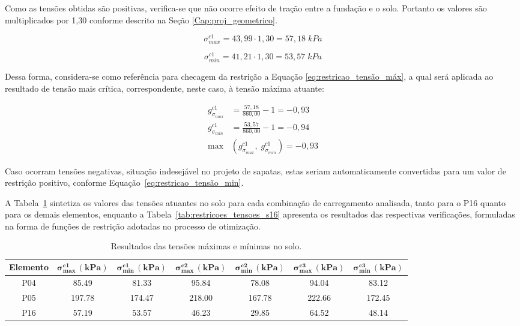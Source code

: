 Como as tensões obtidas são positivas, verifica-se que não ocorre efeito de tração entre a fundação e o solo. Portanto os valores são multiplicados por 1,30 conforme descrito na Seção \ref{Cap:proj_geometrico}.

\begin{equation}
\sigma_{max}^{c1} = 43,99 \cdot 1,30 = 57,18 \; kPa
\label{eq:EL16_sigma_max_cor}
\end{equation}

\begin{equation}
\sigma_{min}^{c1} = 41,21 \cdot 1,30 = 53,57 \; kPa
\label{eq:EL16_sigma_min_cor}
\end{equation}

Dessa forma, considera-se como referência para checagem da restrição a Equação \eqref{eq:restricao_tensão_máx}, a qual será aplicada ao resultado de tensão mais crítica, correspondente, neste caso, à tensão máxima atuante:

\begin{align}
g_{\sigma_{max}}^{c1} &= \frac{57,18}{860{,}00} - 1 = -0{,}93
    \label{eq:EL16_restricao_tensao_max} \\
g_{\sigma_{min}}^{c1} &= \frac{53,57}{860{,}00} - 1 = -0{,}94
    \label{eq:EL16_restricao_tensao_min} \\
\max &\left(g_{\sigma_{max}}^{c1},\; g_{\sigma_{min}}^{c1}\right) = -0{,}93
    \label{eq:EL16_max_tensoes}
\end{align}

Caso ocorram tensões negativas, situação indesejável no projeto de sapatas, estas seriam automaticamente convertidas para um valor de restrição positivo, conforme Equação~\eqref{eq:restricao_tensão_min}.

A Tabela~\ref{tab:tensoes_s16} sintetiza os valores das tensões atuantes no solo para cada combinação de carregamento analisada, tanto para o P16 quanto para os demais elementos, enquanto a Tabela~\ref{tab:restricoes_tensoes_s16} apresenta os resultados das respectivas verificações, formuladas na forma de funções de restrição adotadas no processo de otimização.

\begin{table}[H]
\caption{Resultados das tensões  máximas e mínimas no solo.}
\label{tab:tensoes_s16}
\centering
\begin{tabular}{ccccccc}
\toprule
\textbf{Elemento} & $\mathbf{\sigma_{\max}^{c1}\,(kPa)}$ & $\mathbf{\sigma_{\min}^{c1}\,(kPa)}$ &
$\mathbf{\sigma_{\max}^{c2}\,(kPa)}$ & $\mathbf{\sigma_{\min}^{c2}\,(kPa)}$ &
$\mathbf{\sigma_{\max}^{c3}\,(kPa)}$ & $\mathbf{\sigma_{\min}^{c3}\,(kPa)}$ \\
\midrule
P04 & 85.49  & 81.33  & 95.84  & 78.08  & 94.04  & 83.12 \\
P05 & 197.78 & 174.47 & 218.00 & 167.78 & 222.66 & 172.45 \\
P16 & 57.19  & 53.57  & 46.23  & 29.85  & 64.52  & 48.14 \\
\bottomrule
\end{tabular}
\end{table}

